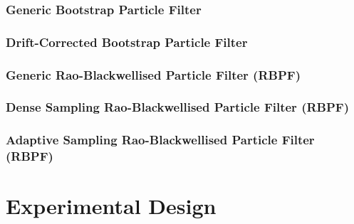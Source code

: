 \documentclass[12pt]{article}
\begin{document}
    \subsubsection{Generic Bootstrap Particle Filter} \label{sec:generic_bootstrap_pf}

	\subsubsection{Drift-Corrected Bootstrap Particle Filter} \label{sec:drift_corrected_pf}
    
    \subsubsection{Generic Rao-Blackwellised Particle Filter (RBPF)} \label{sec:generic_RBPF}
    
    \subsubsection{Dense Sampling Rao-Blackwellised Particle Filter (RBPF)} \label{sec:dense_sampling_RBPF}
    
    \subsubsection{Adaptive Sampling Rao-Blackwellised Particle Filter (RBPF)} \label{sec:adaptive_sampling_RBPF}
    
    

\section{Experimental Design}
\end{document}
